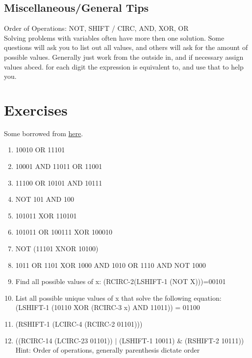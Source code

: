 \documentclass{pset_template}
\begin{document}
\subsection{Miscellaneous/General Tips}
Order of Operations: NOT, SHIFT / CIRC, AND, XOR, OR
\\
Solving problems with variables often have more then one solution. Some questions will ask you to list out all values, and others will ask for the amount of possible values. Generally just work from the outside in, and if necessary assign values abced. for each digit the expression is equivalent to, and use that to help you.
\section{Exercises}
Some borrowed from \href{http://minich.com/education/wyo/acsl/bitstringflicking/bitstringwksht1.htm}{here}.
\begin{enumerate}
\item 10010 OR 11101
\item 10001 AND 11011 OR 11001
\item 11100 OR 10101 AND 10111
\item NOT 101 AND 100
\item 101011 XOR 110101
\item 101011 OR 100111 XOR 100010
\item NOT (11101 XNOR 10100)
\item 1011 OR 1101 XOR 1000 AND 1010 OR 1110 AND NOT 1000
\item Find all possible values of x: (RCIRC-2(LSHIFT-1 (NOT X)))=00101
\item List all possible unique values of x that solve the following equation: \\
(LSHIFT-1 (10110 XOR (RCIRC-3 x) AND 11011)) = 01100
\item (RSHIFT-1 (LCIRC-4 (RCIRC-2 01101)))
\item ((RCIRC-14 (LCIRC-23 01101)) $\mid$ (LSHIFT-1 10011) $\&$ (RSHIFT-2 10111)) \\
Hint: Order of operations, generally parenthesis dictate order
\end{enumerate}
\end{document}
